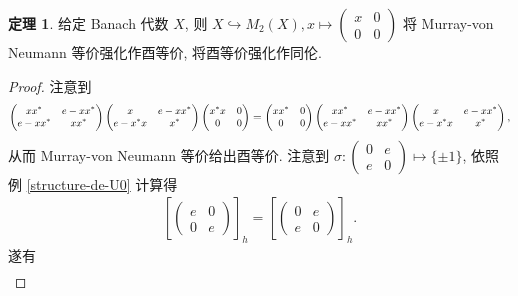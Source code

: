\documentclass{MainStyle}
\theoremstyle{definition}
\theoremstyle{definition}
\theoremstyle{definition}
\theoremstyle{definition}
\theoremstyle{definition}
\theoremstyle{definition}
\theoremstyle{definition}
\newtheorem{theorem}{定理}
\theoremstyle{remark}
\theoremstyle{remark}
\begin{document}
\begin{theorem}\label{reinforce}
    给定 Banach 代数 $X$, 则 $X\hookrightarrow M_2(X), x\mapsto \begin{pmatrix}x&0\\0&0\end{pmatrix}$ 将 Murray-von Neumann 等价强化作酉等价, 将酉等价强化作同伦.
    \begin{proof}
        注意到
        \begin{align*}
            \small\begin{pmatrix}xx^\ast&e-xx^\ast\\e-xx^\ast&xx^\ast\end{pmatrix}\begin{pmatrix}x&e-xx^\ast\\e-x^\ast x&x^\ast\end{pmatrix}\begin{pmatrix}x^\ast x&0\\0&0\end{pmatrix}=\begin{pmatrix}xx^\ast &0\\0&0\end{pmatrix}\begin{pmatrix}xx^\ast&e-xx^\ast\\e-xx^\ast&xx^\ast\end{pmatrix}\begin{pmatrix}x&e-xx^\ast\\e-x^\ast x&x^\ast\end{pmatrix},
        \end{align*}
        从而 Murray-von Neumann 等价给出酉等价. 注意到 $\sigma:\begin{pmatrix}
                0 & e \\e&0
            \end{pmatrix}\mapsto \{\pm 1\}$, 依照例 \ref{structure-de-U0} 计算得
        \begin{align*}
            \left[\begin{pmatrix}e&0\\0&e\end{pmatrix}\right]_h=\left[\begin{pmatrix}0&e\\e&0\end{pmatrix}\right]_h.
        \end{align*}
        遂有
        \begin{align*}

\end{align*}
\end{proof}
\end{theorem}
\end{document}
